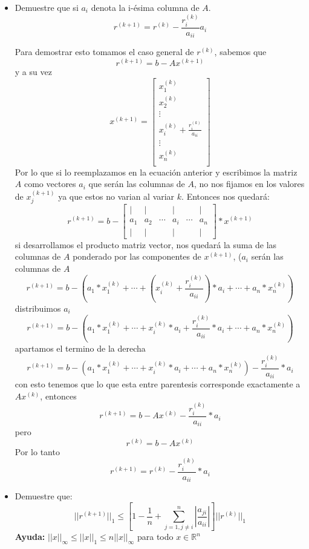 \documentclass{article}
\def\R{\mbox{\(\mathbb{R}\)}}
\begin{document}
\begin{itemize}
\item Demuestre que si $a_i$ denota la i-ésima columna de $A$.
$$ r^{(k+1)} = r^{(k)}-\frac{r_{i}^{(k)}}{a_{ii}}a_i$$

Para demostrar esto tomamos el caso general de $r^{(k)}$, sabemos que
$$r^{(k+1)}= b- Ax^{(k+1)}$$
y a su vez 
$$x^{(k+1)} = 
\begin{bmatrix}
x^{(k)}_{1}\\
x^{(k)}_{2}\\
\vdots\\
x_{i}^{(k)}+\frac{r_{i}^{(k)}}{a_{ii}}\\
\vdots\\
x^{(k)}_{n}\\
\end{bmatrix}
$$
Por lo que si lo reemplazamos en la ecuación anterior y escribimos la matriz $A$ como vectores $a_i$ que serán las columnas de $A$, no nos fijamos en los valores de $x_j^{(k+1)}$ ya que estos no varian al variar $k$. Entonces nos quedará:
$$r^{(k+1)} = b -
\begin{bmatrix}
| & | & & | & &|\\
a_1 & a_2& \cdots & a_i& \cdots & a_n\\
| & | & & | & &|
\end{bmatrix}
*x^{(k+1)}
$$
si desarrollamos el producto matriz vector, nos quedará la suma de las columnas de $A$ ponderado por las componentes de $x^{(k+1)}$, ($a_i$ serán las columnas de $A$
$$r^{(k+1)}= b-\left(a_1*x_1^{(k)}+ \cdots + \left(x_{i}^{(k)}+\frac{r_{i}^{(k)}}{a_{ii}}\right)*a_i+\cdots + a_n*x_{n}^{(k)}\right)$$
distribuimos $a_i$
$$r^{(k+1)}= b-\left(a_1*x_1^{(k)}+ \cdots + x_{i}^{(k)}*a_i+\frac{r_{i}^{(k)}}{a_{ii}}*a_i+\cdots + a_n*x_{n}^{(k)}\right)$$ 
apartamos el termino de la derecha
$$r^{(k+1)}= b-\left(a_1*x_1^{(k)}+ \cdots + x_{i}^{(k)}*a_i+\cdots + a_n*x_{n}^{(k)}\right)-\frac{r_{i}^{(k)}}{a_{ii}}*a_i$$ 
con esto tenemos que lo que esta entre parentesis corresponde exactamente a $Ax^{(k)}$, entonces
$$r^{(k+1)}= b- Ax^{(k)} -\frac{r_{i}^{(k)}}{a_{ii}}*a_i$$
pero 
$$r^{(k)}=b-Ax^{(k)}$$
Por lo tanto 
$$r^{(k+1)}=r^{(k)}-\frac{r_{i}^{(k)}}{a_{ii}}*a_i$$
\item Demuestre que:
$$||r^{(k+1)}||_1 \leq \left[1-\frac{1}{n}+ \sum_{j=1,j\neq i}^{n}\left|\frac{a_{ji}}{a_{ii}}\right| \right] ||r^{(k)}||_1 $$
{\bf Ayuda:} $||x||_{\infty}\leq ||x||_1 \leq n||x||_{\infty}$ para todo $x\in \R^{n}$\\


\end{itemize}
\end{document}
